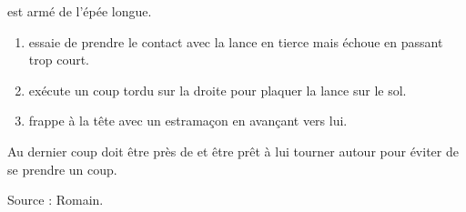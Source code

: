\begin{technique}

\A est armé de l'épée longue.

\begin{enumerate}
	\item \A essaie de prendre le contact avec la lance en tierce mais échoue en passant trop court.
	
	\item \A exécute un coup tordu sur la droite pour plaquer la lance sur le sol.
	
	\item \A frappe \D à la tête avec un estramaçon en avançant vers lui.
\end{enumerate}

Au dernier coup \A doit être près de \D et être prêt à lui tourner autour pour éviter de se prendre un coup.

Source : Romain.
\end{technique}
